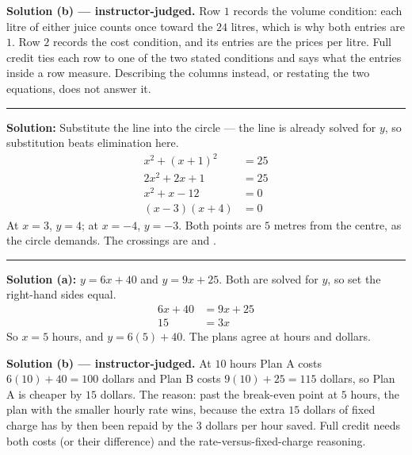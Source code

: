 \documentclass[12pt]{article}
\begin{document}
\vspace{0.15cm}
\textbf{Solution (b) --- instructor-judged.} Row $1$ records the volume condition: each
litre of either juice counts once toward the $24$ litres, which is why both entries are $1$.
Row $2$ records the cost condition, and its entries are the prices per litre. Full credit
ties each row to one of the two stated conditions and says what the entries inside a row
measure. Describing the columns instead, or restating the two equations, does not answer it.

\vspace{0.2cm}\noindent\rule{\linewidth}{0.2pt}


\textbf{Solution:} Substitute the line into the circle --- the line is already solved for
$y$, so substitution beats elimination here.
\begin{align*}
  x^2 + (x + 1)^2 &= 25 \\
  2x^2 + 2x + 1 &= 25 \\
  x^2 + x - 12 &= 0 \\
  (x - 3)(x + 4) &= 0
\end{align*}
At $x = 3$, $y = 4$; at $x = -4$, $y = -3$. Both points are $5$ metres from the centre, as
the circle demands. The crossings are  and .

\vspace{0.2cm}\noindent\rule{\linewidth}{0.2pt}


\textbf{Solution (a):} $y = 6x + 40$ and $y = 9x + 25$. Both are solved for $y$, so set the
right-hand sides equal.
\begin{align*}
  6x + 40 &= 9x + 25 \\
  15 &= 3x
\end{align*}
So $x = 5$ hours, and $y = 6(5) + 40$. The plans agree at  hours and
 dollars.

\vspace{0.15cm}
\textbf{Solution (b) --- instructor-judged.} At $10$ hours Plan A costs
$6(10) + 40 = 100$ dollars and Plan B costs $9(10) + 25 = 115$ dollars, so Plan A is cheaper
by $15$ dollars. The reason: past the break-even point at $5$ hours, the plan with the
smaller hourly rate wins, because the extra $15$ dollars of fixed charge has by then been
repaid by the $3$ dollars per hour saved. Full credit needs both costs (or their difference)
and the rate-versus-fixed-charge reasoning.
\end{document}

